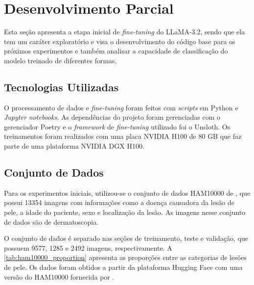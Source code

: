 \chapter{Desenvolvimento Parcial} %

Esta seção apresenta a etapa inicial de \textit{fine-tuning} do \ac{LLaMA}-3.2, sendo que ela tem um caráter exploratório e visa o desenvolvimento do código base para
os próximos experimentos e também analisar a capacidade de classificação do modelo treinado de diferentes formas.

\section{Tecnologias Utilizadas}

O processamento de dados e \textit{fine-tuning} foram feitos com \textit{scripts} em Python e \textit{Jupyter notebooks}. As dependências do projeto foram gerenciadas
com o gerenciador Poetry e o \textit{framework} de \textit{fine-tuning} utilizado foi o Unsloth. Os treinamentos foram realizados com uma placa NVIDIA H100 de 80 GB que
faz parte de uma plataforma NVIDIA DGX H100.

\section{Conjunto de Dados}

Para os experimentos iniciais, utilizou-se o conjunto de dados \ac{HAM10000} de \textcite{tschandl2018ham10000}, que possui 13354 imagens com informações como a doença
causadora da lesão de pele, a idade do paciente, sexo e localização da lesão. As imagens nesse conjunto de dados são de dermatoscopia.

O conjunto de dados é separado nas seções de treinamento, teste e validação, que possuem 9577, 1285 e 2492 imagens, respectivamente. A \autoref{tab:ham10000_proportion}
apresenta as proporções entre as categorias de lesões de pele. Os dados foram obtidos a partir da plataforma Hugging Face com uma versão do \ac{HAM10000} fornecida por
\textcite{skin_cancer_dataset}.

